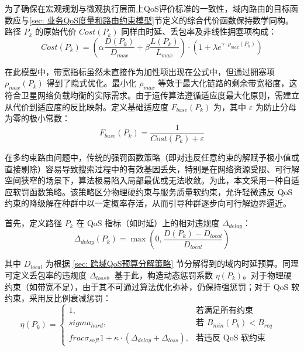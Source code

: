 \documentclass[print, master, vlined]{DissertUESTC}
\begin{document}
    为了确保在宏观规划与微观执行层面上QoS评价标准的一致性，域内路由的目标函数应与\ref{sec: 业务QoS度量和路由约束模型}节定义的综合代价函数保持数学同构。路径 $P_k$ 的原始代价 $Cost(P_k)$ 同样由时延、丢包率及非线性拥塞项构成：
    \begin{equation}
    \label{formula: 适应度函数}
        Cost(P_k) = \left( \alpha \frac{D(P_k)}{D_{max}} + \beta \frac{L(P_k)}{L_{max}} \right) \cdot (1 + \lambda e^{\gamma \cdot \rho_{max}(P_k)})
    \end{equation}
    
    在此模型中，带宽指标虽然未直接作为加性项出现在公式中，但通过拥塞项 $\rho_{max}(P_k)$ 得到了隐式优化。最小化 $\rho_{max}$ 等效于最大化链路的剩余带宽裕度，这符合卫星网络负载均衡的实际需求。由于遗传算法遵循适应度最大化原则，需建立从代价到适应度的反比映射。定义基础适应度 $F_{base}(P_k)$ 为，其中 $\varepsilon$ 为防止分母为零的极小常数：
    \begin{equation}
        F_{base}(P_k) = \frac{1}{Cost(P_k) + \varepsilon}
    \end{equation}
    
    在多约束路由问题中，传统的强罚函数策略（即对违反任意约束的解赋予极小值或直接剔除）容易导致搜索过程中的有效基因丢失，特别是在网络资源受限、可行解空间狭窄的场景下，算法极易陷入局部最优或无法收敛。为此，本文采用一种自适应软罚函数策略。该策略区分物理硬约束与服务质量软约束，允许轻微违反 QoS 约束的降级解在种群中以一定概率存活，从而引导种群逐步向可行解边界逼近。
    
    首先，定义路径 $P_k$ 在 QoS 指标（如时延）上的相对违规度 $\Delta_{delay}$：
    \begin{equation}
        \Delta_{delay}(P_k) = \max \left( 0, \frac{D(P_k) - D_{local}}{D_{local}} \right)
    \end{equation}
    
    其中 $D_{local}$ 为根据 \ref{sec: 跨域QoS预算分解策略} 节分解得到的域内时延预算。同理可定义丢包率的违规度 $\Delta_{loss}$。基于此，构造动态惩罚系数 $\eta(P_k)$。对于物理硬约束（如带宽不足），由于其不可通过算法优化弥补，仍保持强惩罚；对于 QoS 软约束，采用反比例衰减惩罚：
    \begin{equation}
        \eta(P_k) =\begin{cases}1, & \text{若满足所有约束} \\sigma_{hard}, & \text{若 } B_{min}(P_k) < B_{req} \quad \\frac{\sigma_{soft}}{1 + \kappa \cdot (\Delta_{delay} + \Delta_{loss})}, & \text{若违反 QoS 软约束}\end{cases}
    \end{equation}
    
\end{document}
